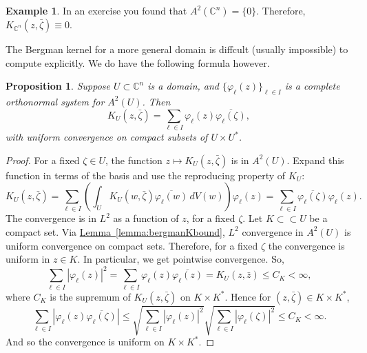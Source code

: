 \documentclass[12pt,openany]{book}
\newcommand{\abs}[1]{\left\lvert {#1} \right\rvert}
\newcommand{\C}{{\mathbb{C}}}
\theoremstyle{plain}
\newtheorem{prop}[thm]{Proposition}
\theoremstyle{remark}
\theoremstyle{definition}
\theoremstyle{exercise}
\theoremstyle{example}
\newtheorem{example}[thm]{Example}
\newcommand{\lemmaref}[1]{\hyperref[#1]{Lemma~\ref*{#1}}}
\begin{document}
\begin{example}
In an exercise you found that
$A^2(\C^n) = \{ 0 \}$.  Therefore,
$K_{\C^n}(z,\bar{\zeta}) \equiv 0$.
\end{example}

The Bergman kernel for a more general domain is diffcult (usually impossible)
to compute explicitly.  We do have the following formula however.

\begin{prop}
Suppose $U \subset \C^n$ is a domain, and
$\{ \varphi_\ell (z) \}_{\ell\in I}$ is a complete orthonormal system
for $A^2(U)$.  Then
\begin{equation*}
K_U(z,\bar{\zeta})
=
\sum_{\ell \in I} \varphi_\ell(z) \overline{\varphi_\ell(\zeta)} ,
\end{equation*}
with uniform convergence on compact subsets of $U \times U^*$.
\end{prop}

\begin{proof}
For a fixed $\zeta \in U$, the function $z \mapsto K_U(z,\bar{\zeta})$ is
in $A^2(U)$.
Expand this function
in terms of the basis and use the reproducing property of $K_U$:
\begin{equation*}
K_U(z,\bar{\zeta}) =
\sum_{\ell \in I}
\left(\int_U K_U(w,\bar{\zeta}) \overline{\varphi_\ell(w)} \, dV(w) \right)
\varphi_\ell(z)
=
\sum_{\ell \in I}
\overline{\varphi_\ell(\zeta)}
\varphi_\ell(z) .
\end{equation*}
The convergence is in $L^2$ as a function of $z$, for a fixed $\zeta$.
Let $K \subset \subset U$ be a compact set.
Via \lemmaref{lemma:bergmanKbound}, $L^2$ convergence in $A^2(U)$ is uniform convergence on
compact sets.  Therefore, for a fixed $\zeta$ the convergence is uniform in
$z \in K$.  In particular, we get pointwise convergence.  So,
\begin{equation*}
\sum_{\ell \in I}
\abs{
\varphi_\ell(z)
}^2
=
\sum_{\ell \in I}
\varphi_\ell(z)
\overline{\varphi_\ell(z)}
=
K_U(z,\bar{z})
\leq C_K < \infty ,
\end{equation*}
where $C_K$ is the supremum of $K_U(z,\bar{\zeta})$ on $K \times K^*$.
Hence for $(z,\bar{\zeta}) \in K \times K^*$,
\begin{equation*}
\sum_{\ell \in I}
\abs{
\varphi_\ell(z)
\overline{\varphi_\ell(\zeta)}
}
\leq
\sqrt{
\sum_{\ell \in I}
\abs{
\varphi_\ell(z)
}^2
}
\sqrt{
\sum_{\ell \in I}
\abs{
\varphi_\ell(\zeta)
}^2
}
\leq
C_K < \infty .
\end{equation*}
And so the convergence is uniform on $K \times K^*$.
\end{proof}
\end{document}

